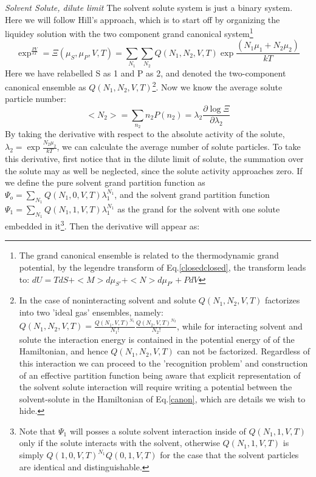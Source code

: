   
  \emph{Solvent Solute, dilute limit}
  The solvent solute system is just a binary system.  Here we will follow Hill's approach, which is to start off by organizing the liquidey solution with the two component grand canonical system\footnote{The grand canonical ensemble is related to the thermodynamic grand potential, by the legendre transform of Eq.\ref{closedclosed}, the transform leads to: $dU = TdS + <M> d\mu_{S'}  +<N> d\mu_{P'}  + PdV$}
  \begin{equation}\label{xi1}
    \exp^{\frac{PV}{kT} } = \Xi(\mu_S, \mu_P,V,T) = \sum_{N_1} \sum_{N_2} Q(N_1, N_2,V,T) \exp{\frac{(N_1 \mu_{1} + N_2 \mu_{2})}{kT}}
  \end{equation}
Here we have relabelled S as 1 and P as 2, and denoted the two-component canonical ensemble as $Q(N_1, N_2,V,T)$\footnote{In the case of noninteracting solvent and solute $Q(N_1, N_2,V,T)$ factorizes into two 'ideal gas' ensembles, namely:  $Q(N_1, N_2,V,T)=\frac{Q(N_1,V,T)^{N_1}}{N_1!} \frac{Q(N_2,V,T)^{N_2}}{N_2!}$, while for interacting solvent and solute the interaction energy is contained in the potential energy of of the Hamiltonian, and hence $Q(N_1, N_2,V,T)$ can not be factorized.  Regardless of this interaction we can proceed to the 'recognition problem' and construction of an effective partition function being aware that explicit representation of the solvent solute interaction will require writing a potential between the solvent-solute in the Hamiltonian of Eq.\ref{canon}, which are details we wish to hide.}.  Now we know the average solute particle number:
\begin{equation}\label{averageN1}
  < N_2 > = \sum_{n_2}  n_2 P(n_2) = \lambda_{2}  \frac{\partial\log \Xi}{\partial \lambda_{2}}
\end{equation}
By taking the derivative with respect to the absolute activity of the solute, $\lambda_{2}=\exp{\frac{N_2\mu_{2}}{kT}}$, we can calculate the average number of solute particles.  To take this derivative, first notice that in the dilute limit of solute, the summation over the solute may as well be neglected, since the solute activity approaches zero.  If we define the pure solvent grand partition function as $\Psi_o=\sum_{N_1} Q(N_1,0,V,T)\lambda_1^{N_1}$, and the solvent grand partition function $\Psi_1=\sum_{N_1} Q(N_1,1,V,T)\lambda_1^{N_1}$ as the grand for the solvent with one solute embedded in it\footnote{Note that $\Psi_1$ will posses a solute solvent interaction inside of $Q(N_1,1,V,T)$ only if the solute interacts with the solvent, otherwise $Q(N_1,1,V,T)$ is simply $Q(1,0,V,T)^{N_1}Q(0,1,V,T)$ for the case that the solvent particles are identical and distinguishable.}.  Then the derivative will appear as:
